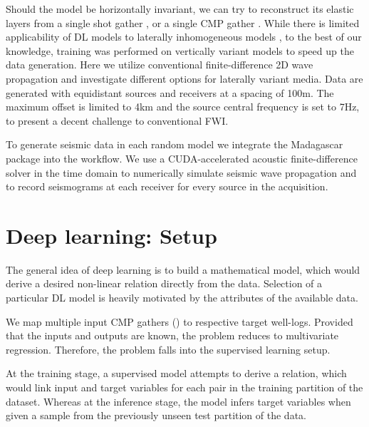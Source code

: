 \documentclass[paper,twocolomn]{geophysics}
\begin{document}
Should the model be horizontally invariant, we can try to reconstruct its elastic layers from a single shot gather \citep{roth1994}, or a single CMP gather \citep{zheng2019}.
While there is limited applicability of DL models to laterally inhomogeneous models \citep{zheng2019}, to the best of our knowledge, training was performed on vertically variant models to speed up the data generation. Here we utilize conventional finite-difference 2D wave propagation and investigate different options for laterally variant media.
Data are generated with equidistant sources and receivers at a spacing of 100m. The maximum offset is limited to 4km and the source central frequency is set to 7Hz, to present a decent challenge to conventional FWI.

To generate seismic data in each random model we integrate the Madagascar package \citep{fomel2013madagascar} into the workflow. 
We use a CUDA-accelerated acoustic finite-difference solver in the time domain to numerically simulate seismic wave propagation and to record seismograms at each receiver for every source in the acquisition.
%





\section{Deep learning: Setup}
The general idea of deep learning is to build a mathematical model, which would derive a desired non-linear relation directly from the data. Selection of a particular DL model is heavily motivated by the attributes of the available data. 

We map multiple input CMP gathers () to respective target well-logs. Provided that the inputs and outputs are known, the problem reduces to multivariate regression. Therefore, the problem falls into the supervised learning setup.  

At the training stage, a supervised model attempts to derive a relation, which would link input and target variables for each pair in the training partition of the dataset. Whereas at the inference stage, the model infers target variables when given a sample from the previously unseen test partition of the data.
\end{document}
